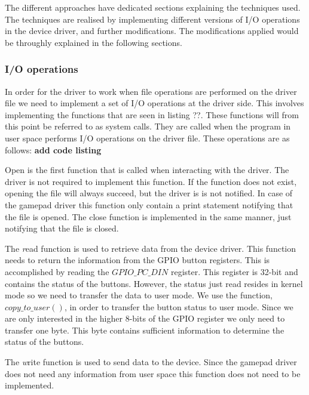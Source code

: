 The different approaches have dedicated sections explaining the techniques used. The techniques are realised by implementing different versions of I/O operations in the device driver, and further modifications. The modifications applied would be throughly explained in the following sections. 


\subsubsection{I/O operations}
In order for the driver to work when file operations are performed on the driver file we need to implement a set of I/O operations at the driver side. This involves implementing the functions that are seen in listing ??. These functions will from this point be referred to as system calls. They are called when the program in user space performs I/O operations on the driver file. These operations are as follows: {\bf add code listing}

Open is the first function that is called when interacting with the driver. The driver is not required to implement this function. If the function does not exist, opening the file will always succeed, but the driver is is not notified. In case of the gamepad driver this function only contain a print statement notifying that the file is opened. The close function is implemented in the same manner, just notifying that the file is closed. 

The \emph read function is used to retrieve data from the device driver. This function needs to return the information from the GPIO button registers. This is accomplished by reading the $GPIO\_PC\_DIN$ register. This register is 32-bit and contains the status of the buttons. However, the status just read resides in kernel mode so we need to transfer the data to user mode. We use the function, $copy\_to\_user()$, in order to transfer the button status to user mode. Since we are only interested in the higher 8-bits of the GPIO register we only need to transfer one byte. This byte contains sufficient information to determine the status of the buttons. 

The \emph write function is used to send data to the device. Since the gamepad driver does not need any information from user space this function does not need to be implemented. 






